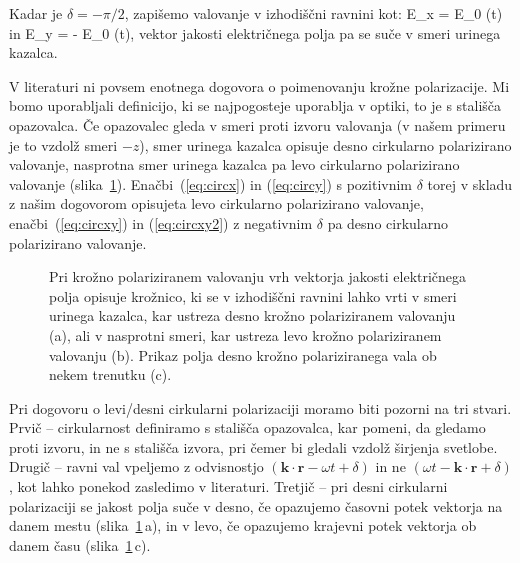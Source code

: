 Kadar je $\delta = -\pi/2$, zapišemo valovanje v izhodiščni ravnini kot:
\beq
E_x = E_0 \cos (\omega t)
\label{eq:circxy}
\eeq
in 
\beq
E_y = - E_0 \sin (\omega t),
\label{eq:circxy2}
\eeq
vektor jakosti električnega polja pa se suče v smeri urinega kazalca.

V literaturi ni povsem enotnega dogovora o poimenovanju krožne polarizacije. 
Mi bomo uporabljali definicijo, ki se najpogosteje uporablja v optiki, to
je s stališča opazovalca. Če opazovalec gleda v smeri proti izvoru valovanja 
(v našem primeru je to vzdolž smeri $-z$), smer urinega kazalca opisuje desno 
cirkularno polarizirano valovanje, nasprotna smer urinega kazalca pa levo 
cirkularno polarizirano valovanje (slika~\ref{fig:03_cirkpol}).
Enačbi~(\ref{eq:circx}) in (\ref{eq:circy}) s pozitivnim
$\delta$ torej v skladu z našim dogovorom opisujeta levo cirkularno 
polarizirano valovanje, enačbi~(\ref{eq:circxy}) in (\ref{eq:circxy2}) 
z negativnim $\delta$ pa desno cirkularno polarizirano valovanje. 

\begin{figure}[h]
\centering
\def\svgwidth{140truemm} 

\caption{Pri krožno polariziranem valovanju vrh vektorja
jakosti električnega polja opisuje krožnico, ki se v izhodiščni ravnini
lahko vrti v smeri urinega kazalca, kar ustreza desno krožno polariziranem valovanju (a),
ali v nasprotni smeri, kar ustreza levo krožno polariziranem valovanju (b). 
Prikaz polja desno krožno polariziranega vala ob nekem trenutku (c).}
\label{fig:03_cirkpol}
\end{figure}

\begin{remark}
Pri dogovoru o levi/desni cirkularni polarizaciji moramo biti pozorni na tri stvari. 
Prvič -- cirkularnost definiramo s stališča opazovalca, kar pomeni, da gledamo proti izvoru,
in ne s stališča izvora, pri čemer bi gledali vzdolž širjenja svetlobe. Drugič --
ravni val vpeljemo z odvisnostjo $(\mathbf{k}\cdot \mathbf{r} - \omega t + \delta)$ in 
ne $(\omega t - \mathbf{k}\cdot \mathbf{r} + \delta)$, kot lahko ponekod zasledimo v literaturi.
Tretjič -- pri desni cirkularni polarizaciji se jakost polja suče v desno, če opazujemo 
časovni potek vektorja na danem mestu (slika~\ref{fig:03_cirkpol}\,a), in v levo, 
če opazujemo krajevni potek vektorja ob danem času (slika~\ref{fig:03_cirkpol}\,c). 
\end{remark}

